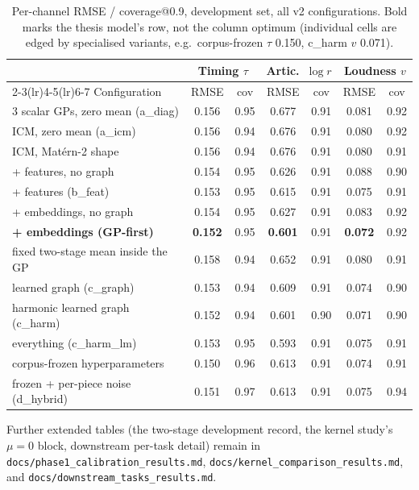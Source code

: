 \documentclass[11pt,a4paper]{report}
\begin{document}
\begin{table}[h]\centering
\caption{Per-channel RMSE / coverage@0.9, development set, all v2 configurations.
Bold marks the thesis model's row, not the column optimum (individual cells are
edged by specialised variants, e.g.\ corpus-frozen $\tau$ 0.150, c\_harm $v$ 0.071).}
\label{tab:perchannel-full}
\footnotesize
\begin{tabular}{@{}lcccccc@{}}
\toprule
 & \multicolumn{2}{c}{Timing $\tau$} & \multicolumn{2}{c}{Artic.\ $\log r$} & \multicolumn{2}{c}{Loudness $v$} \\
\cmidrule(lr){2-3}\cmidrule(lr){4-5}\cmidrule(lr){6-7}
Configuration & RMSE & cov & RMSE & cov & RMSE & cov \\
\midrule
3 scalar GPs, zero mean (a\_diag)      & 0.156 & 0.95 & 0.677 & 0.91 & 0.081 & 0.92 \\
ICM, zero mean (a\_icm)                & 0.156 & 0.94 & 0.676 & 0.91 & 0.080 & 0.92 \\
ICM, Mat\'ern-2 shape                  & 0.156 & 0.94 & 0.676 & 0.91 & 0.080 & 0.91 \\
+ features, no graph                   & 0.154 & 0.95 & 0.626 & 0.91 & 0.088 & 0.90 \\
+ features (b\_feat)                   & 0.153 & 0.95 & 0.615 & 0.91 & 0.075 & 0.91 \\
+ embeddings, no graph                 & 0.154 & 0.95 & 0.627 & 0.91 & 0.083 & 0.92 \\
\textbf{+ embeddings (GP-first)}       & \textbf{0.152} & 0.95 & \textbf{0.601} & 0.91 & \textbf{0.072} & 0.92 \\
fixed two-stage mean inside the GP     & 0.158 & 0.94 & 0.652 & 0.91 & 0.080 & 0.91 \\
learned graph (c\_graph)               & 0.153 & 0.94 & 0.609 & 0.91 & 0.074 & 0.90 \\
harmonic learned graph (c\_harm)       & 0.152 & 0.94 & 0.601 & 0.90 & 0.071 & 0.90 \\
everything (c\_harm\_lm)               & 0.153 & 0.95 & 0.593 & 0.91 & 0.075 & 0.91 \\
corpus-frozen hyperparameters          & 0.150 & 0.96 & 0.613 & 0.91 & 0.074 & 0.91 \\
frozen + per-piece noise (d\_hybrid)   & 0.151 & 0.97 & 0.613 & 0.91 & 0.075 & 0.94 \\
\bottomrule
\end{tabular}
\end{table}

\noindent Further extended tables (the two-stage development record, the kernel
study's $\mu=0$ block, downstream per-task detail) remain in
\texttt{docs/phase1\_calibration\_results.md},
\texttt{docs/kernel\_comparison\_results.md}, and
\texttt{docs/downstream\_tasks\_results.md}.
\end{document}
